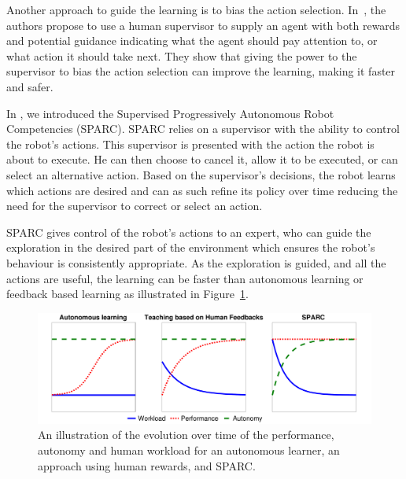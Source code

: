 \documentclass[letterpaper]{article} %
\begin{document}
Another approach to guide the learning is to bias the action selection.
In~\cite{thomaz2008teachable}, the authors propose to use a human supervisor to
supply an agent with both rewards and potential guidance indicating what the
agent should pay attention to, or what action it should take next. They show
that giving the power to the supervisor to bias the action selection can improve
the learning, making it faster and safer.

In \cite{senft2015sparc}, we introduced the Supervised Progressively Autonomous
Robot Competencies (SPARC). SPARC relies on a supervisor with the ability to
control the robot's actions. This supervisor is presented with the action the
robot is about to execute. He can then choose to cancel it, allow it to be
executed, or can select an alternative action. Based on the supervisor's
decisions, the robot learns which actions are desired and can as such refine its
policy over time reducing the need for the supervisor to correct or select an
action.

SPARC gives control of the robot's actions to an expert, who can guide the
exploration in the desired part of the environment which ensures the robot's
behaviour is consistently appropriate. As the exploration is guided, and all the
actions are useful, the learning can be faster than autonomous learning or
feedback based learning as illustrated in Figure~\ref{fig:comparison}.

\begin{figure}
    \centering
    \includegraphics[width=0.9\linewidth]{./figs/motivation.pdf}
    \caption{An illustration of the evolution over time of the performance,
    autonomy and human workload for an autonomous learner, an approach using
    human rewards, and SPARC.}
    \label{fig:comparison}
\end{figure}

\end{document}
